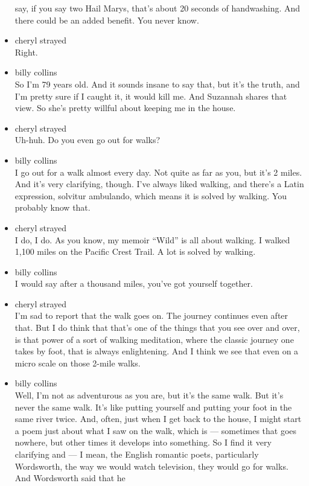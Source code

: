 \begin{itemize}
  say, if you say two Hail Marys, that's about 20 seconds of
  handwashing. And there could be an added benefit. You never know.
\item
  cheryl strayed\\
  Right.
\item
  billy collins\\
  So I'm 79 years old. And it sounds insane to say that, but it's the
  truth, and I'm pretty sure if I caught it, it would kill me. And
  Suzannah shares that view. So she's pretty willful about keeping me in
  the house.
\item
  cheryl strayed\\
  Uh-huh. Do you even go out for walks?
\item
  billy collins\\
  I go out for a walk almost every day. Not quite as far as you, but
  it's 2 miles. And it's very clarifying, though. I've always liked
  walking, and there's a Latin expression, solvitur ambulando, which
  means it is solved by walking. You probably know that.
\item
  cheryl strayed\\
  I do, I do. As you know, my memoir ``Wild'' is all about walking. I
  walked 1,100 miles on the Pacific Crest Trail. A lot is solved by
  walking.
\item
  billy collins\\
  I would say after a thousand miles, you've got yourself together.
\item
  cheryl strayed\\
  I'm sad to report that the walk goes on. The journey continues even
  after that. But I do think that that's one of the things that you see
  over and over, is that power of a sort of walking meditation, where
  the classic journey one takes by foot, that is always enlightening.
  And I think we see that even on a micro scale on those 2-mile walks.
\item
  billy collins\\
  Well, I'm not as adventurous as you are, but it's the same walk. But
  it's never the same walk. It's like putting yourself and putting your
  foot in the same river twice. And, often, just when I get back to the
  house, I might start a poem just about what I saw on the walk, which
  is --- sometimes that goes nowhere, but other times it develops into
  something. So I find it very clarifying and --- I mean, the English
  romantic poets, particularly Wordsworth, the way we would watch
  television, they would go for walks. And Wordsworth said that he

\end{itemize}
